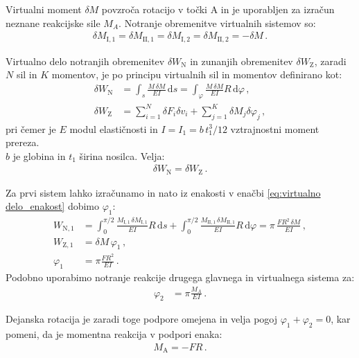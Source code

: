         Virtualni moment $\delta M$ povzroča rotacijo v točki A in je uporabljen za izračun neznane reakcijske sile $M_A$. Notranje obremenitve virtualnih sistemov so: 
        \begin{align}
            \delta M_{\text{I},1} = \delta M_{\text{II},1} = \delta M_{\text{I},2}= \delta M_{\text{II},2} = - \delta M \,.
        \end{align}
        
        Virtualno delo notranjih obremenitev $\delta W_\text{N}$ in zunanjih obremenitev $\delta W_\text{Z}$, zaradi $N$ sil in $K$ momentov, je po principu virtualnih sil in momentov definirano kot:
        \begin{align}
            \delta W_\text{N} &=  \int_{s}^{} \frac{M  \, \delta M}{E I} \,\text{d}s =  \int_{\varphi}^{} \frac{M  \, \delta M}{E I} R \,\text{d}\varphi \, ,\\
            \delta W_\text{Z} &=  \sum_{i=1}^{N} \delta F_i \delta v_i + \sum_{j=1}^{K} \delta M_j \delta \varphi_j    \,,
        \end{align}
        pri čemer je $E$ modul elastičnosti in $I=I_1=b \, t_1^3 /12$ vztrajnostni moment prereza. \\ $b$ je globina in $t_1$ širina nosilca. Velja: 
        \begin{align}\label{eq:virtualno delo_enakost}
             \delta W_\text{N} = \delta W_\text{Z}\,.
        \end{align}
        
        Za prvi sistem lahko izračunamo in  nato iz enakosti v enačbi \eqref{eq:virtualno delo_enakost} dobimo $\varphi_1$:
        \begin{align}
             W_{\text{N}, 1} &= \int_{0}^{\pi/2} \frac{M_{\text{I},1} \, \delta M_{\text{I},1}}{E I} R \,\text{d}s +
             \int_{0}^{\pi/2} \frac{M_{\text{II},1}  \, \delta M_{\text{II},1}}{E I} R \,\text{d}\varphi =
             \pi  \, \frac{F R^2  \, \delta M}{E I} \,, \\
             W_{\text{Z}, 1} &= \delta M \, \varphi_1 \,,  \\
             \varphi_1 &= \pi \frac{F R^2}{E I} \,.
        \end{align}
        Podobno uporabimo notranje reakcije drugega glavnega in virtualnega sistema za:
        \begin{align}
             \varphi_2 &= \pi \frac{M_A}{E I} \,.
        \end{align}

        Dejanska rotacija je zaradi toge podpore omejena in velja pogoj $\varphi_1 + \varphi_2 = 0$, kar pomeni, da je momentna reakcija v podpori enaka:
        \begin{align}
             M_\text{A}= - F R \,.
        \end{align}
        
